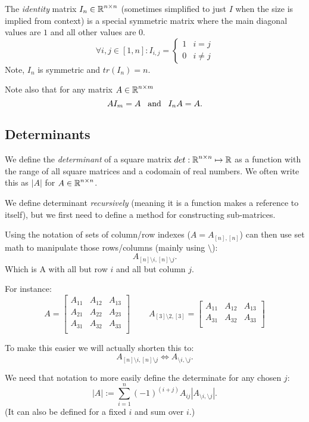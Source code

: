The \emph{identity} matrix $I_n \in\operatorname{\mathbb{R}}^{n\times n}$ (sometimes simplified to just $I$ when the size is implied from context) 
is a special symmetric matrix where the main diagonal values are $1$ and all other values are $0$.
\[
\forall i,j \in [1,n]: I_{i,j} = \begin{cases} 1 & i=j\\ 0 & i\ne j\end{cases}
\]
Note, $I_n$ is symmetric and $tr(I_n)=n$.

Note also that for any matrix $A\in\operatorname{\mathbb{R}}^{n\times m}$ 
\[
AI_m = A \;\;\;\textnormal{and}\;\;\; I_nA = A.
\]


\subsection{Determinants}
We define the \emph{determinant} of a square matrix $det: \operatorname{\mathbb{R}}^{n\times n} \mapsto \operatorname{\mathbb{R}}$ 
as a function with the range of all square matrices and a codomain of real numbers. 
We often write this as $|A|$ for $A\in\operatorname{\mathbb{R}}^{n\times n}$. 

We define determinant \emph{recursively} (meaning it is a function makes a reference to itself), 
but we first need to define a method for constructing sub-matrices. 

Using the notation of sets of column/row indexes ($A = A_{[n],[n]}$) can then use set math to manipulate those rows/columns (mainly using $\setminus$): 
\[A_{[n]\setminus i,[n]\setminus j}.\]
Which is A with all but row $i$ and all but column $j$. 

For instance: 
\[A = \left[\begin{matrix}A_{11} & A_{12} & A_{13}\\ A_{21} & A_{22} & A_{23}\\ A_{31} & A_{32} & A_{33}\\\end{matrix}\right] \;\;\;\;\;\;\;\;
A_{[3]\setminus 2,[3]} = \left[\begin{matrix}A_{11} & A_{12} & A_{13}\\ A_{31} & A_{32} & A_{33}\\\end{matrix}\right]\]

To make this easier we will actually shorten this to: 
\[A_{[n]\setminus i,[n]\setminus j} \iff A_{\setminus i,\setminus j}.\]

We need that notation to more easily define the determinate for any chosen $j$:
\[
|A| := \sum_{i=1}^n  (-1)^{(i+j)}  A_{ij} \left|A_{\setminus i,\setminus j}\right|.
\]
(It can also be defined for a fixed $i$ and sum over $i$.)


